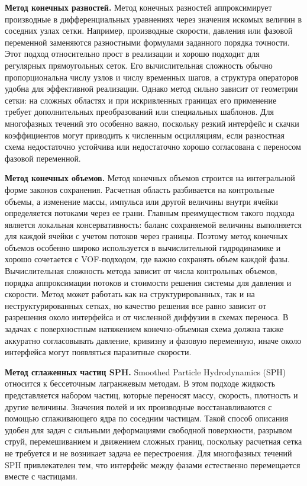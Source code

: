 \documentclass[12pt,a4paper]{article}
\begin{document}
\textbf{Метод конечных разностей.}
Метод конечных разностей аппроксимирует производные в дифференциальных
уравнениях через значения искомых величин в соседних узлах сетки. Например,
производные скорости, давления или фазовой переменной заменяются разностными
формулами заданного порядка точности. Этот подход относительно прост в
реализации и хорошо подходит для регулярных прямоугольных сеток. Его
вычислительная сложность обычно пропорциональна числу узлов и числу временных
шагов, а структура операторов удобна для эффективной реализации. Однако метод
сильно зависит от геометрии сетки: на сложных областях и при искривленных
границах его применение требует дополнительных преобразований или специальных
шаблонов. Для многофазных течений это особенно важно, поскольку резкий
интерфейс и скачки коэффициентов могут приводить к численным осцилляциям, если
разностная схема недостаточно устойчива или недостаточно хорошо согласована с
переносом фазовой переменной.

\textbf{Метод конечных объемов.}
Метод конечных объемов строится на интегральной форме законов сохранения.
Расчетная область разбивается на контрольные объемы, а изменение массы,
импульса или другой величины внутри ячейки определяется потоками через ее
грани. Главным преимуществом такого подхода является локальная
консервативность: баланс сохраняемой величины выполняется для каждой ячейки с
учетом потоков через границы. Поэтому метод конечных объемов особенно широко
используется в вычислительной гидродинамике и хорошо сочетается с VOF-подходом,
где важно сохранять объем каждой фазы. Вычислительная сложность метода зависит
от числа контрольных объемов, порядка аппроксимации потоков и стоимости решения
системы для давления и скорости. Метод может работать как на структурированных,
так и на неструктурированных сетках, но качество решения все равно зависит от
разрешения около интерфейса и от численной диффузии в схемах переноса. В
задачах с поверхностным натяжением конечно-объемная схема должна также
аккуратно согласовывать давление, кривизну и фазовую переменную, иначе около
интерфейса могут появляться паразитные скорости.

\textbf{Метод сглаженных частиц SPH.}
Smoothed Particle Hydrodynamics (SPH) относится к бессеточным лагранжевым
методам. В этом подходе жидкость представляется набором частиц, которые
переносят массу, скорость, плотность и другие величины. Значения полей и их
производные восстанавливаются с помощью сглаживающего ядра по соседним
частицам. Такой способ описания удобен для задач с сильными деформациями
свободной поверхности, разрывом струй, перемешиванием и движением сложных
границ, поскольку расчетная сетка не требуется и не возникает задача ее
перестроения. Для многофазных течений SPH привлекателен тем, что интерфейс
между фазами естественно перемещается вместе с частицами.
\end{document}
